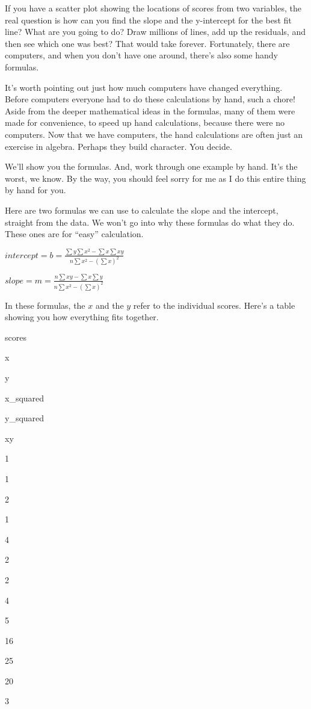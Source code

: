 \documentclass[]{book}
\begin{document}
If you have a scatter plot showing the locations of scores from two variables, the real question is how can you find the slope and the y-intercept for the best fit line? What are you going to do? Draw millions of lines, add up the residuals, and then see which one was best? That would take forever. Fortunately, there are computers, and when you don't have one around, there's also some handy formulas.

It's worth pointing out just how much computers have changed everything. Before computers everyone had to do these calculations by hand, such a chore! Aside from the deeper mathematical ideas in the formulas, many of them were made for convenience, to speed up hand calculations, because there were no computers. Now that we have computers, the hand calculations are often just an exercise in algebra. Perhaps they build character. You decide.

We'll show you the formulas. And, work through one example by hand. It's the worst, we know. By the way, you should feel sorry for me as I do this entire thing by hand for you.

Here are two formulas we can use to calculate the slope and the intercept, straight from the data. We won't go into why these formulas do what they do. These ones are for ``easy'' calculation.

\(intercept = b = \frac{\sum{y}\sum{x^2}-\sum{x}\sum{xy}}{n\sum{x^2}-(\sum{x})^2}\)

\(slope = m = \frac{n\sum{xy}-\sum{x}\sum{y}}{n\sum{x^2}-(\sum{x})^2}\)

In these formulas, the \(x\) and the \(y\) refer to the individual scores. Here's a table showing you how everything fits together.

scores

x

y

x\_squared

y\_squared

xy

1

1

2

1

4

2

2

4

5

16

25

20

3
\end{document}
